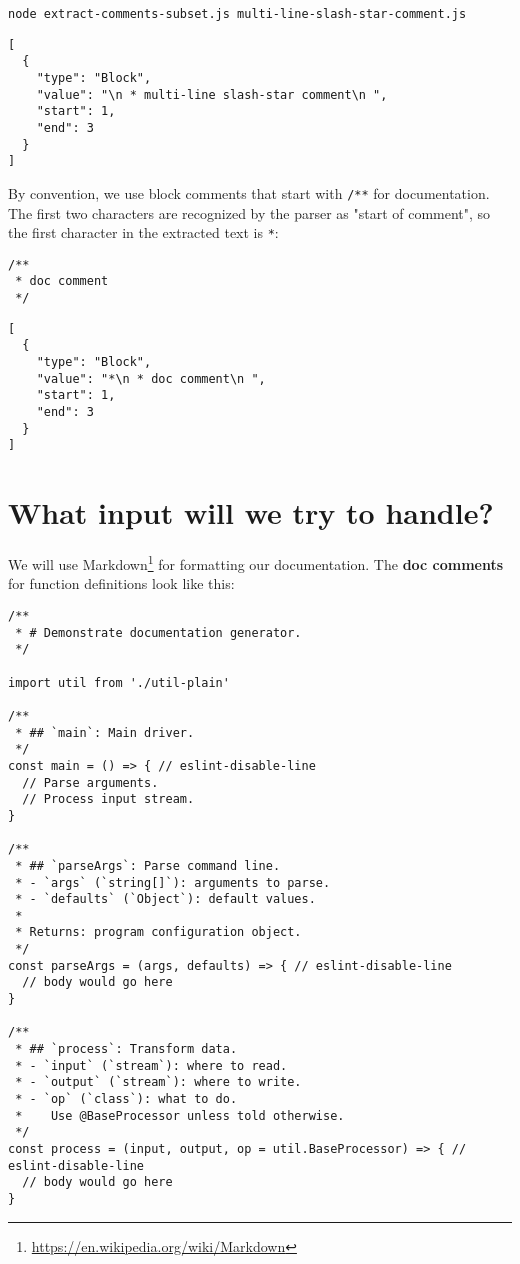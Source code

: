 \documentclass[krantzl]{krantz}
\newcommand{\glossref}[1]{\textbf{#1}}
\newcommand{\hreffoot}[2]{{#1}\footnote{\href{#2}{#2}}}
\begin{document}
\begin{lstlisting}[frame=single,frameround=tttt]
node extract-comments-subset.js multi-line-slash-star-comment.js
\end{lstlisting}



\begin{lstlisting}[frame=single,frameround=tttt]
[
  {
    "type": "Block",
    "value": "\n * multi-line slash-star comment\n ",
    "start": 1,
    "end": 3
  }
]
\end{lstlisting}



By convention,
we use block comments that start with \texttt{/**} for documentation.
The first two characters are recognized by the parser as "start of comment",
so the first character in the extracted text is \texttt{*}:


\begin{lstlisting}[frame=single,frameround=tttt]
/**
 * doc comment
 */
\end{lstlisting}



\begin{lstlisting}[frame=single,frameround=tttt]
[
  {
    "type": "Block",
    "value": "*\n * doc comment\n ",
    "start": 1,
    "end": 3
  }
]
\end{lstlisting}


\section{What input will we try to handle?}\label{doc-generator-input}


We will use \hreffoot{Markdown}{https://en.wikipedia.org/wiki/Markdown} for formatting our documentation.
The \glossref{doc comments} for function definitions look like this:


\begin{lstlisting}[frame=single,frameround=tttt]
/**
 * # Demonstrate documentation generator.
 */

import util from './util-plain'

/**
 * ## `main`: Main driver.
 */
const main = () => { // eslint-disable-line
  // Parse arguments.
  // Process input stream.
}

/**
 * ## `parseArgs`: Parse command line.
 * - `args` (`string[]`): arguments to parse.
 * - `defaults` (`Object`): default values.
 *
 * Returns: program configuration object.
 */
const parseArgs = (args, defaults) => { // eslint-disable-line
  // body would go here
}

/**
 * ## `process`: Transform data.
 * - `input` (`stream`): where to read.
 * - `output` (`stream`): where to write.
 * - `op` (`class`): what to do.
 *    Use @BaseProcessor unless told otherwise.
 */
const process = (input, output, op = util.BaseProcessor) => { // eslint-disable-line
  // body would go here
}
\end{lstlisting}
\end{document}
